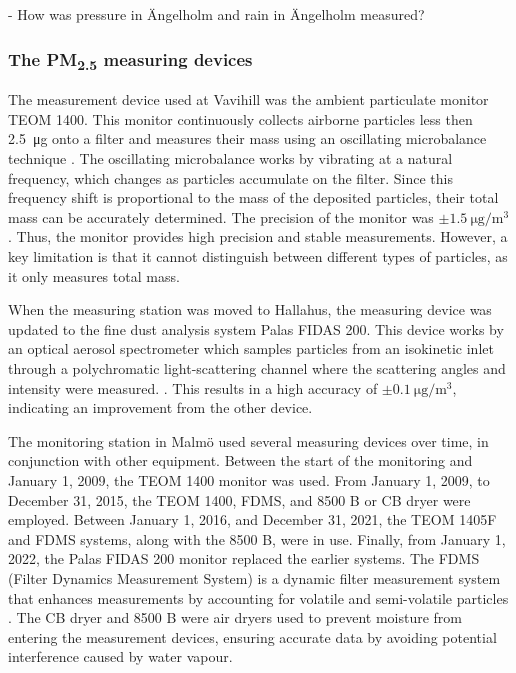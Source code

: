 - How was pressure in Ängelholm  and rain in Ängelholm measured? 

\subsubsection{The \texorpdfstring{PM\textsubscript{2.5}}{PM2.5} measuring devices}
The measurement device used at Vavihill was the ambient particulate monitor TEOM 1400. This monitor continuously collects airborne particles less then \SI{2.5}{\micro\g} onto a filter and measures their mass using an oscillating microbalance technique \cite{thermofisherscientificinc.TEOMSeries1400a2007}. The oscillating microbalance works by vibrating at a natural frequency, which changes as particles accumulate on the filter. Since this frequency shift is proportional to the mass of the deposited particles, their total mass can be accurately determined. The precision of the monitor was $\pm\SI{1.5}{\micro\gram\per\meter\cubed}$. Thus, the monitor provides high precision and stable measurements. However, a key limitation is that it cannot distinguish between different types of particles, as it only measures total mass.

When the measuring station was moved to Hallahus, the measuring device was updated to the fine dust analysis system Palas FIDAS 200. This device works by an optical aerosol spectrometer which samples particles from an isokinetic inlet through a polychromatic light-scattering channel where the scattering angles and intensity were measured. \cite{palasgmbhOperatingManualFidas}. This results in a high accuracy of $\pm\SI{0.1}{\micro\gram\per\meter\cubed}$, indicating an improvement from the other device. 

The monitoring station in Malmö used several measuring devices over time, in conjunction with other equipment. Between the start of the monitoring and January 1, 2009, the TEOM 1400 monitor was used. From January 1, 2009, to December 31, 2015, the TEOM 1400, FDMS, and 8500 B or CB dryer were employed. Between January 1, 2016, and December 31, 2021, the TEOM 1405F and FDMS systems, along with the 8500 B, were in use. Finally, from January 1, 2022, the Palas FIDAS 200 monitor replaced the earlier systems. The FDMS (Filter Dynamics Measurement System) is a dynamic filter measurement system that enhances measurements by accounting for volatile and semi-volatile particles \cite{thermoscientific8500FDMSFilter2010}. The CB dryer and 8500 B were air dryers used to prevent moisture from entering the measurement devices, ensuring accurate data by avoiding potential interference caused by water vapour.

